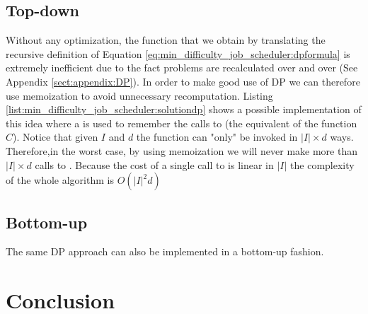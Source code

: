\subsection{Top-down}
Without any optimization, the function that we obtain by translating the recursive definition of
Equation \ref{eq:min_difficulty_job_scheduler:dpformula} is extremely inefficient due to the fact
problems are recalculated over and over (See Appendix \ref{sect:appendix:DP}). In order to make good
use of DP we can therefore use memoization to avoid unnecessary recomputation. Listing
\ref{list:min_difficulty_job_scheduler:solutiondp} shows a possible implementation of this idea
where a  is used to remember the calls to 
(the equivalent of the function $C$). Notice that given $I$ and $d$ the function can "only"  be invoked in $|I|
\times d$ ways. Therefore,in the worst case, by using memoization  we will never
make more than $|I| \times d$ calls to . Because the cost of a single call to  is linear in $|I|$ the complexity of the whole algorithm is $O(|I|^2 d)$



\subsection{Bottom-up}
The same  DP approach can also be implemented in a bottom-up fashion. 

\section{Conclusion}